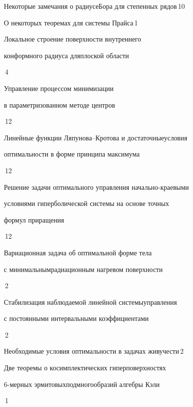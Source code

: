 

{Некоторые замечания о радиусе\newline Бора для степенных рядов}{\No\,10}




{О некоторых теоремах для системы Прайса}{\No\,1}




{Локальное строение поверхности внутреннего 


конформного радиуса для\newline плоской области}{\No\,4}




{Управление процессом минимизации \newline


в параметризованном методе центров}{\No\,12}




{Линейные функции Ляпунова--Кротова и достаточные\newline условия


оптимальности в форме принципа максимума}{\No\,12}




{Решение задачи оптимального управления начально-краевыми\newline


условиями гиперболической системы на основе точных


формул приращения}{\No\,12}




{Вариационная задача об оптимальной форме тела


с минимальным\newline радиационным нагревом поверхности}{\No\,2}




{Стабилизация наблюдаемой линейной системы\newline управления


с постоянными интервальными коэффициентами}{\No\,2}




{Необходимые условия оптимальности в задачах живучести}{\No\,2}




{Две теоремы о косимплектических гиперповерхностях


6-мерных эрмитовых\newline подмногообразий алгебры Кэли}{\No\,1}


